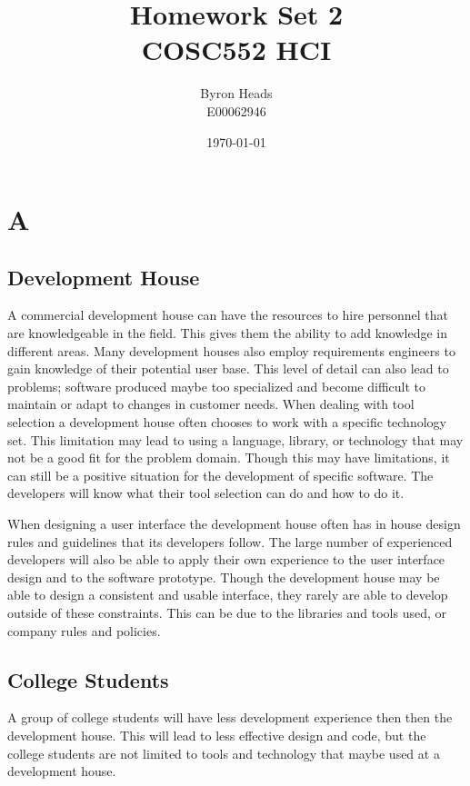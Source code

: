 \documentclass[12pt]{report}
\title{Homework Set 2 \\
    COSC552 HCI}
\author{ Byron Heads \\
    E00062946 }
\date{\today}
\begin{document}
\maketitle

\chapter*{A}

\section*{Development House}
A commercial development house can have the resources to hire personnel that are knowledgeable in the field.  This gives them the ability to add knowledge in different areas.  Many development houses also employ requirements engineers to gain knowledge of their potential user base.  This level of detail can also lead to problems; software produced maybe too specialized and become difficult to maintain or adapt to changes in customer needs.  When dealing with tool selection a development house often chooses to work with a specific technology set.  This limitation may lead to using a language, library, or technology that may not be a good fit for the problem domain.  Though this may have limitations, it can still be a positive situation for the development of specific  software.  The developers will know what their tool selection can do and how to do it.

When designing a user interface the development house often has in house design rules and guidelines that its developers follow.  The large number of experienced developers will also be able to apply their own experience to the user interface design and to the software prototype.  Though the development house may be able to design a consistent and usable interface, they rarely are able to develop outside of these constraints.  This can be due to the libraries and tools used, or company rules and policies. 

\section*{College Students}

A group of college students will have less development experience then then the development house.  This will lead to less effective design and code, but the college students are not limited to tools and technology that maybe used at a development house.  
\end{document}

